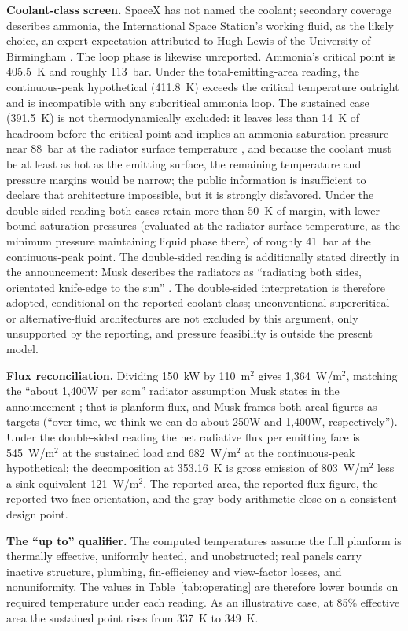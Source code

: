 \documentclass[11pt]{article}
\begin{document}
\textbf{Coolant-class screen.} SpaceX has not named the coolant; secondary coverage describes ammonia, the International Space Station's working fluid, as the likely choice, an expert expectation attributed to Hugh Lewis of the University of Birmingham \cite{gagadget2026}. The loop phase is likewise unreported. Ammonia's critical point is 405.5~K and roughly 113~bar. Under the total-emitting-area reading, the continuous-peak hypothetical (411.8~K) exceeds the critical temperature outright and is incompatible with any subcritical ammonia loop. The sustained case (391.5~K) is not thermodynamically excluded: it leaves less than 14~K of headroom before the critical point and implies an ammonia saturation pressure near 88~bar at the radiator surface temperature \cite{nist}, and because the coolant must be at least as hot as the emitting surface, the remaining temperature and pressure margins would be narrow; the public information is insufficient to declare that architecture impossible, but it is strongly disfavored. Under the double-sided reading both cases retain more than 50~K of margin, with lower-bound saturation pressures (evaluated at the radiator surface temperature, as the minimum pressure maintaining liquid phase there) of roughly 41~bar at the continuous-peak point. The double-sided reading is additionally stated directly in the announcement: Musk describes the radiators as ``radiating both sides, orientated knife-edge to the sun'' \cite{dcd2026}. The double-sided interpretation is therefore adopted, conditional on the reported coolant class; unconventional supercritical or alternative-fluid architectures are not excluded by this argument, only unsupported by the reporting, and pressure feasibility is outside the present model.

\textbf{Flux reconciliation.} Dividing 150~kW by 110~m$^{2}$ gives 1{,}364~W/m$^{2}$, matching the ``about 1,400W per sqm'' radiator assumption Musk states in the announcement \cite{dcd2026}; that is planform flux, and Musk frames both areal figures as targets (``over time, we think we can do about 250W and 1,400W, respectively''). Under the double-sided reading the net radiative flux per emitting face is 545~W/m$^{2}$ at the sustained load and 682~W/m$^{2}$ at the continuous-peak hypothetical; the decomposition at 353.16~K is gross emission of 803~W/m$^{2}$ less a sink-equivalent 121~W/m$^{2}$. The reported area, the reported flux figure, the reported two-face orientation, and the gray-body arithmetic close on a consistent design point.

\textbf{The ``up to'' qualifier.} The computed temperatures assume the full planform is thermally effective, uniformly heated, and unobstructed; real panels carry inactive structure, plumbing, fin-efficiency and view-factor losses, and nonuniformity. The values in Table~\ref{tab:operating} are therefore lower bounds on required temperature under each reading. As an illustrative case, at 85\% effective area the sustained point rises from 337~K to 349~K.
\end{document}
